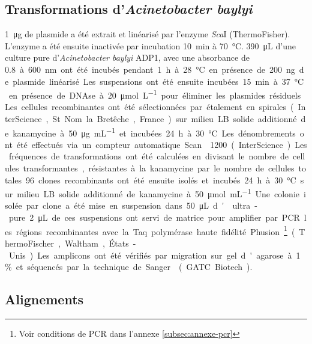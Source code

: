 \subsection{Transformations d'\emph{Acinetobacter baylyi}}
\label{subsec:transfo}

\SI{1}{\ug} de plasmide a été extrait et linéarisé par l'enzyme \emph{Sca}I
(ThermoFisher). L'enzyme a été ensuite inactivée par incubation \SI{10}{\minute}
à \SI{70}{\celsius}. \SI{390}{\uL} d'une culture pure d'\emph{Acinetobacter
  baylyi} ADP1, avec une absorbance de \SI{0,8} à \SI{600}{\nm} ont été incubés
pendant \SI{1}{\hour} à \SI{28}{\celsius} en présence de \SI{200}{\ng} de
plasmide linéarisé. Les suspensions ont été ensuite incubées \SI{15}{\minute} à
\SI{37}{\celsius} en présence de DNAse à \SI{20}{\umol\per\L} pour éliminer les
plasmides résiduels. Les cellules recombinantes ont été sélectionnées par
étalement en spirales (InterScience, St Nom la Bretêche, France) sur milieu LB
solide additionné de kanamycine à \SI{50}{\ug\per\mL} et incubées \SI{24}{\hour}
à \SI{30}{\celsius}. Les dénombrements ont été effectués via un compteur
automatique Scan\textsuperscript{\textregistered}1200 (InterScience). Les
fréquences de transformations ont été calculées en divisant le nombre de
cellules transformantes, résistantes à la kanamycine par le nombre de cellules
totales. 96 clones recombinants ont été ensuite isolés et incubés \SI{24}{\hour}
à \SI{30}{\celsius} sur milieu LB solide additionné de kanamycine à
\SI{50}{\umol\per\mL}. Une colonie isolée par clone a été mise en suspension
dans \SI{50}{\uL} d' ultra-pure. \SI{2}{\uL} de ces suspensions ont
servi de matrice pour amplifier par PCR les régions recombinantes avec la Taq
polymérase haute fidélité Phusion \footnote{Voir conditions de PCR dans l'annexe
  \ref{subsec:annexe-pcr}} (ThermoFischer, Waltham, États-Unis). Les amplicons
ont été vérifiés par migration sur gel d'agarose à 1\% et séquencés par la
technique de Sanger\cite{sanger_dna_1977} (GATC Biotech).

\subsection{Alignements}
\label{subsec:align}

